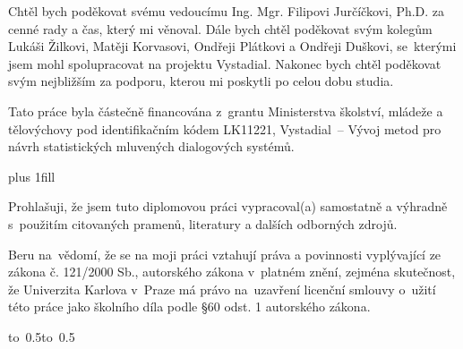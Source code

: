 \documentclass[12pt,a4paper]{report}
\let\openright=\clearpage
\begin{document}
\newpage



\openright

\noindent
Chtěl bych poděkovat svému vedoucímu Ing. Mgr. Filipovi Jurčíčkovi, Ph.D. za cenné rady a čas, který mi věnoval. 
Dále bych chtěl poděkovat svým kolegům Lukáši Žilkovi, Matěji Korvasovi, Ondřeji Plátkovi a Ondřeji Duškovi, se~kterými jsem mohl spolupracovat na projektu Vystadial.
Nakonec bych chtěl poděkovat svým nejbližším za podporu, kterou mi poskytli po celou dobu studia.

Tato práce byla částečně financována z~grantu Ministerstva školství, mládeže a tělovýchovy pod identifikačním kódem LK11221, Vystadial~-- Vývoj metod pro návrh statistických mluvených dialogových systémů.

\newpage


\vglue 0pt plus 1fill

\noindent
Prohlašuji, že jsem tuto diplomovou práci vypracoval(a) samostatně a výhradně
s~použitím citovaných pramenů, literatury a dalších odborných zdrojů.

\medskip\noindent
Beru na~vědomí, že se na moji práci vztahují práva a povinnosti vyplývající
ze zákona č. 121/2000 Sb., autorského zákona v~platném znění, zejména skutečnost,
že Univerzita Karlova v~Praze má právo na~uzavření licenční smlouvy o~užití této
práce jako školního díla podle §60 odst. 1 autorského zákona.

\vspace{10mm}

\hbox{\hbox to 0.5\hbox to 0.5}

\vspace{20mm}
\newpage

\end{document}
